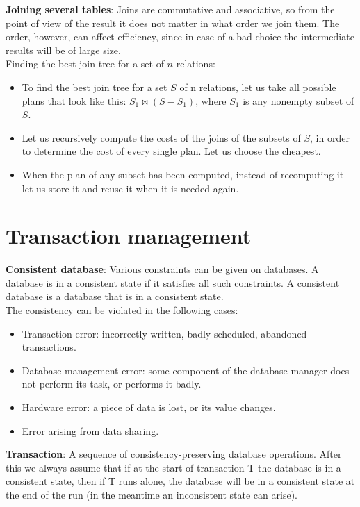 \documentclass[margin=0px]{article}
\begin{document}
\noindent \textbf{Joining several tables}: Joins are commutative and associative, so from the point of view of the result
it does not matter in what order we join them. The order, however, can affect efficiency, since in case of a bad choice
the intermediate results will be of large size.\\

\noindent Finding the best join tree for a set of $n$ relations:
\begin{itemize}
    \item	To find the best join tree for a set $S$ of n relations,
          let us take all possible plans that look like this: $S_{1} \Join (S - S_{1})$, where $S_{1}$ is any nonempty subset of $S$.

    \item	Let us recursively compute the costs of the joins of the subsets of $S$, in order to determine the cost of every single plan. Let us choose the cheapest.

    \item	When the plan of any subset has been computed, instead of recomputing it let us store it and reuse it when it is needed again.
\end{itemize}

\section{Transaction management}

\noindent \textbf{Consistent database}: Various constraints can be given on databases. A database is in a consistent state
if it satisfies all such constraints. A consistent database is a database that is in a consistent state.\\

\noindent The consistency can be violated in the following cases:
\begin{itemize}
    \item	Transaction error: incorrectly written, badly scheduled, abandoned transactions.
    \item	Database-management error: some component of the database manager does not perform its task, or performs it badly.
    \item	Hardware error: a piece of data is lost, or its value changes.
    \item	Error arising from data sharing.
\end{itemize}

\noindent \textbf{Transaction}: A sequence of consistency-preserving database operations. After this we always assume that if
at the start of transaction T the database is in a consistent state, then if T runs alone, the database will be in a consistent state
at the end of the run (in the meantime an inconsistent state can arise).
\end{document}
